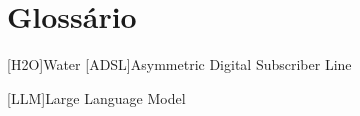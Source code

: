 \chapter{Glossário}

\footnotesize
\SingleSpacing

\begin{multicols}{2}
\begin{acronym}[AAAAAA]

	[H2O]{Water}
	[ADSL]{Asymmetric Digital Subscriber Line}

        [LLM]{Large Language Model}

\end{acronym}
\end{multicols}




 